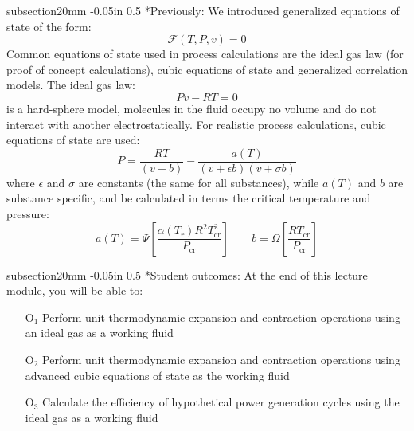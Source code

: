 \documentclass[11pt]{article}
\makeatletter
\theoremstyle{definition}
\renewcommand\subsection{\@startsection
	{subsection}{2}{0mm}
	{-0.05in}
	{0.5\baselineskip}
	{\normalfont\normalsize\bfseries}}
\makeatother
\begin{document}
\begin{mdframed}[backgroundcolor=lgray]
\subsection*{Previously:}
\noindent We introduced generalized equations of state of the form:
\begin{equation}
	\mathcal{F}\left(T,P,v\right) = 0
\end{equation}
Common equations of state used in process calculations are the ideal gas law (for proof of concept calculations), cubic equations of state and generalized correlation models. The ideal gas law:
\begin{equation}
	Pv - RT = 0
\end{equation}is a hard-sphere model, molecules in the fluid occupy no volume and do not interact with another electrostatically.
For realistic process calculations, cubic equations of state are used:
\begin{equation}
	P = \frac{RT}{\left(v-b\right)}-\frac{a(T)}{\left(v+\epsilon b\right)\left(v+\sigma b\right)}
\end{equation}where $\epsilon$ and $\sigma$ are constants (the same for all substances), while
$a(T)$ and $b$ are substance specific, and be calculated in terms the critical temperature and pressure:
\begin{equation}
	a\left(T\right) = \Psi\left[\frac{\alpha\left(T_{r}\right)R^{2}T^{2}_{\mathrm{cr}}}{P_{\mathrm{cr}}}\right]\qquad
	b = \Omega\left[\frac{RT_{\mathrm{cr}}}{P_{\mathrm{cr}}}\right]
\end{equation}

\subsection*{Student outcomes:}
At the end of this lecture module, you will be able to:
\begin{itemize}
	\item[O$_1$]{Perform unit thermodynamic expansion and contraction operations using an ideal gas as a working fluid}
	\item[O$_2$]{Perform unit thermodynamic expansion and contraction operations using advanced cubic equations of state as the working fluid}
	\item[O$_3$]{Calculate the efficiency of hypothetical power generation cycles using the ideal gas as a working fluid}
\end{itemize}

\end{mdframed}
\end{document}

